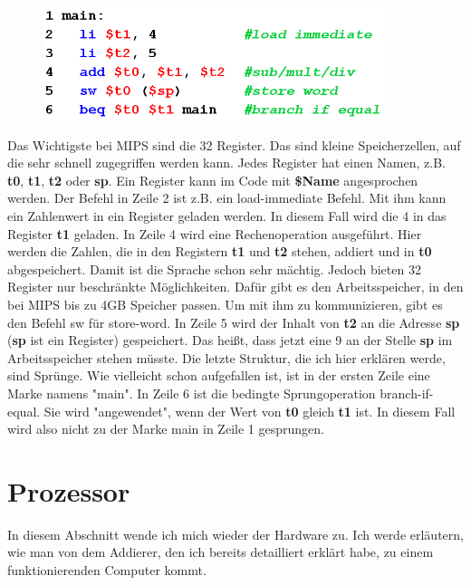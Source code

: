 \documentclass[12pt, a4paper]{article}
\begin{document}
\begin{figure}[H]
	\includegraphics [width=10cm]{MIPS.png}
\end{figure}

Das Wichtigste bei MIPS sind die 32 Register. Das sind kleine Speicherzellen, auf die sehr schnell zugegriffen werden kann. Jedes Register hat einen Namen, z.B. \textbf{t0}, \textbf{t1}, \textbf{t2} oder \textbf{sp}. Ein Register kann im Code mit \textbf{\$Name} angesprochen werden. Der Befehl in Zeile 2 ist z.B. ein load-immediate Befehl. Mit ihm kann ein Zahlenwert in ein Register geladen werden. In diesem Fall wird die 4 in das Register \textbf{t1} geladen. In Zeile 4 wird eine Rechenoperation ausgeführt. Hier werden die Zahlen, die in den Registern \textbf{t1} und \textbf{t2} stehen, addiert und in \textbf{t0} abgespeichert. Damit ist die Sprache schon sehr mächtig. Jedoch bieten 32 Register nur beschränkte Möglichkeiten. Dafür gibt es den Arbeitsspeicher, in den bei MIPS bis zu 4GB Speicher passen. Um mit ihm zu kommunizieren, gibt es den Befehl sw für store-word. In Zeile 5 wird der Inhalt von \textbf{t2} an die Adresse \textbf{sp} (\textbf{sp} ist ein Register) gespeichert. Das heißt, dass jetzt eine 9 an der Stelle \textbf{sp} im Arbeitsspeicher stehen müsste. Die letzte Struktur, die ich hier erklären werde, sind Sprünge. Wie vielleicht schon aufgefallen ist, ist in der ersten Zeile eine Marke namens "main". In Zeile 6 ist die bedingte Sprungoperation branch-if-equal. Sie wird "angewendet", wenn der Wert von \textbf{t0} gleich \textbf{t1} ist. In diesem Fall wird also nicht zu der Marke main in Zeile 1 gesprungen.


\section{Prozessor}
In diesem Abschnitt wende ich mich wieder der Hardware zu. Ich werde erläutern, wie man von dem Addierer, den ich bereits detailliert erklärt habe, zu einem funktionierenden Computer kommt.
\end{document}
